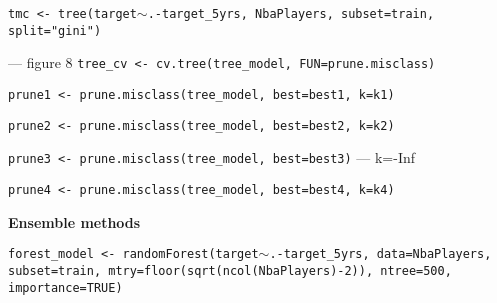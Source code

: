 \begin{center}

\texttt{tmc <- tree(target$\sim$.-target\_5yrs, NbaPlayers, subset=train, split="gini")}


--- figure 8
\texttt{tree\_cv <- cv.tree(tree\_model, FUN=prune.misclass)}


\texttt{prune1 <- prune.misclass(tree\_model, best=best1, k=k1)}

\texttt{prune2 <- prune.misclass(tree\_model, best=best2, k=k2)}

\texttt{prune3 <- prune.misclass(tree\_model, best=best3)} --- k=-Inf

\texttt{prune4 <- prune.misclass(tree\_model, best=best4, k=k4)}

\end{center}

\noindent
\textbf{Ensemble methods}

\begin{center}


\texttt{forest\_model <- randomForest(target$\sim$.-target\_5yrs, data=NbaPlayers, subset=train, mtry=floor(sqrt(ncol(NbaPlayers)-2)), ntree=500, importance=TRUE)}



\end{center}